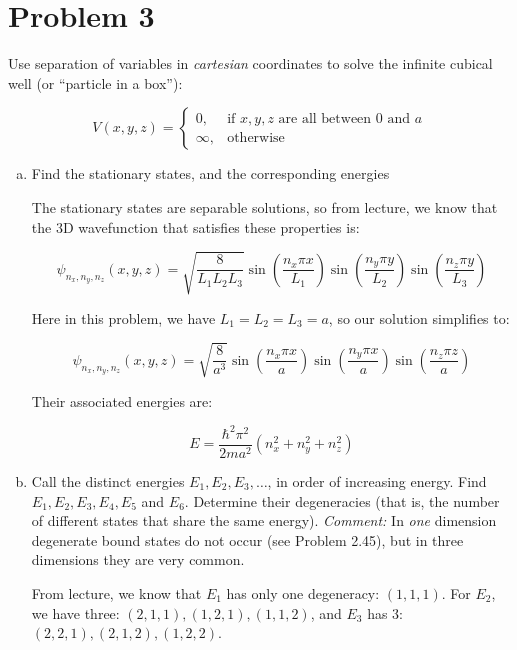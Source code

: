 \documentclass[10pt]{article}
\begin{document}
    \pagebreak

    \section*{Problem 3}

    Use separation of variables in \textit{cartesian} coordinates to solve the infinite cubical well (or ``particle in a box''):

    \[ V(x, y, z) = \begin{cases}
        0, & \text{if $x, y, z$ are all between 0 and $a$}\\
        \infty, & \text{otherwise}
    \end{cases}\]

    \begin{enumerate}[(a)]
        \item Find the stationary states, and the corresponding energies
        
        \begin{solution}
            The stationary states are separable solutions, so from lecture, we know that the 3D wavefunction that satisfies these properties is:

            \[ \psi_{n_x, n_y, n_z}(x, y, z) = \sqrt{\frac{8}{L_1L_2L_3}} \sin \left(\frac{n_x \pi x}{L_1}\right) \sin\left(\frac{n_y \pi y}{L_2}\right) \sin \left(\frac{n_z\pi y}{L_3}\right)\] 

            Here in this problem, we have $L_1 = L_2 = L_3 = a$, so our solution simplifies to: 

            \[ \psi_{n_x, n_y, n_z}(x,y,z) = \sqrt{\frac{8}{a^3}} \sin\left(\frac{n_x \pi x}{a}\right) \sin\left(\frac{n_y \pi x}{a}\right) \sin\left(\frac{n_z \pi z}{a}\right)\]

            Their associated energies are: 

            \[ E = \frac{\hbar^2 \pi^2}{2ma^2}(n_x^2 +n_y^2 + n_z^2)\]
        \end{solution}
        \item Call the distinct energies $E_1, E_2, E_3, \dots$, in order of increasing energy. Find $E_1, E_2, E_3, E_4, E_5$ and $E_6$. Determine their degeneracies (that is, the number of different states that share the same energy). \textit{Comment:} In \textit{one} dimension degenerate bound states do not occur (see Problem 2.45), but in three dimensions they are very common. 
        
        \begin{solution}
            From lecture, we know that $E_1$ has only one degeneracy: $(1, 1, 1)$. For $E_2$, we have three: $(2, 1, 1), (1, 2, 1), (1, 1, 2)$, and $E_3$ has 3: $(2, 2, 1), (2, 1, 2), (1, 2, 2)$. 


\end{solution}
\end{enumerate}
\end{document}
